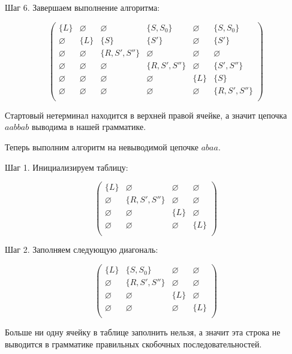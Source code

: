 \begin{example}
\bigbreak 
Шаг 6. Завершаем выполнение алгоритма:

\[
\begin{pmatrix}
\{L\}  		& \varnothing & \varnothing    & \{S, S_0\}	 	  & \varnothing & \{S, S_0\} 	 \\
\varnothing & \{L\} 	  & \{S\}  		   & \{S'\}  		  & \varnothing & \{S'\}	 	 \\
\varnothing & \varnothing & \{R, S', S''\} & \varnothing 	  & \varnothing & \varnothing 	 \\
\varnothing & \varnothing & \varnothing    & \{R, S', S''\}   & \varnothing & \{S', S''\}	 \\
\varnothing & \varnothing & \varnothing    & \varnothing 	  & \{L\} 	    & \{S\}	 		 \\
\varnothing & \varnothing & \varnothing    & \varnothing 	  & \varnothing & \{R, S', S''\} \\
\end{pmatrix}
\]


Стартовый нетерминал находится в верхней правой ячейке, а значит цепочка $a a b b a b$ выводима в нашей грамматике.
\end{example}

\begin{example}
Теперь выполним алгоритм на невыводимой цепочке $abaa$. 

Шаг 1. Инициализируем таблицу:

\[
\begin{pmatrix}
\{L\}  		& \varnothing 	 & \varnothing & \varnothing 	\\  
\varnothing & \{R, S', S''\} & \varnothing & \varnothing   	\\
\varnothing & \varnothing 	 & \{L\} 	   & \varnothing    \\
\varnothing & \varnothing 	 & \varnothing & \{L\} 			\\
\end{pmatrix}
\]

Шаг 2. Заполняем следующую диагональ: 

\[
\begin{pmatrix}
\{L\}  		& \{S, S_0\} 	 & \varnothing & \varnothing 	\\  
\varnothing & \{R, S', S''\} & \varnothing & \varnothing   	\\
\varnothing & \varnothing 	 & \{L\} 	   & \varnothing    \\
\varnothing & \varnothing 	 & \varnothing & \{L\} 			\\
\end{pmatrix}
\]

Больше ни одну ячейку в таблице заполнить нельзя, а значит эта строка не выводится в грамматике правильных скобочных последовательностей. 

\end{example}

